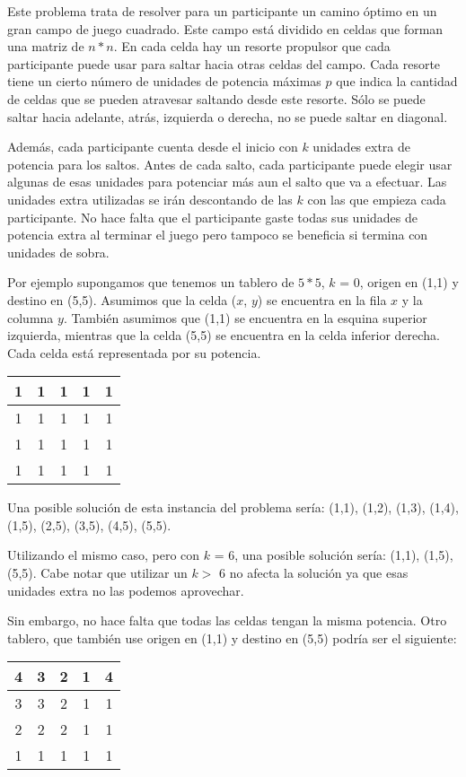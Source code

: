 Este problema trata de resolver para un participante un camino óptimo en un gran campo de juego cuadrado. Este campo está dividido en celdas que forman una matriz de $n * n$. En cada celda hay un resorte propulsor que cada participante puede usar para saltar hacia otras celdas del campo. Cada resorte tiene un cierto número de unidades de potencia máximas $p$ que indica la cantidad de celdas que se pueden atravesar saltando desde este resorte. Sólo se puede saltar hacia adelante, atrás, izquierda o derecha, no se puede saltar en diagonal.

Además, cada participante cuenta desde el inicio con $k$ unidades extra de potencia para los saltos. Antes de cada salto, cada participante puede elegir usar algunas de esas unidades para potenciar más aun el salto que va a efectuar. Las unidades extra utilizadas se irán descontando de las $k$ con las que empieza cada participante. No hace falta que el participante gaste todas sus unidades de potencia extra al terminar el juego pero tampoco se beneficia si termina con unidades de sobra.

Por ejemplo supongamos que tenemos un tablero de $5*5$, $k$ = 0, origen en (1,1) y destino en (5,5). Asumimos que la celda ($x$, $y$) se encuentra en la fila $x$ y la columna $y$. También asumimos que (1,1) se encuentra en la esquina superior izquierda, mientras que la celda (5,5) se encuentra en la celda inferior derecha. Cada celda está representada por su potencia.
\begin{center}
\begin{tabular}{|c|c|c|c|c|}
\hline
 1 & 1 & 1 & 1 & 1 \\
 \hline
 1 & 1 & 1 & 1 & 1 \\
 \hline
 1 & 1 & 1 & 1 & 1 \\
 \hline
 1 & 1 & 1 & 1 & 1 \\
 \hline
\end{tabular}
\end{center}

Una posible solución de esta instancia del problema sería: (1,1), (1,2), (1,3), (1,4), (1,5), (2,5), (3,5), (4,5), (5,5).

Utilizando el mismo caso, pero con $k$ = 6, una posible solución sería: (1,1), (1,5), (5,5). Cabe notar que utilizar un $k >$ 6 no afecta la solución ya que esas unidades extra no las podemos aprovechar.

Sin embargo, no hace falta que todas las celdas tengan la misma potencia. Otro tablero, que también use origen en (1,1) y destino en (5,5) podría ser el siguiente:
\begin{center}
\begin{tabular}{|c|c|c|c|c|}
\hline
 4 & 3 & 2 & 1 & 4 \\
 \hline
 3 & 3 & 2 & 1 & 1 \\
 \hline
 2 & 2 & 2 & 1 & 1 \\
 \hline
 1 & 1 & 1 & 1 & 1 \\
 \hline
\end{tabular}
\end{center}

